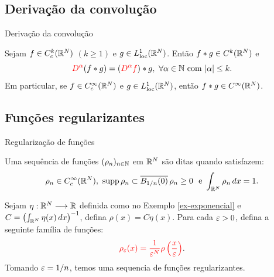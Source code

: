 \subsection*{Derivação da convolução}
\begin{frame}{Derivação da convolução}
		
	\begin{prop}
		Sejam  {\color{red}$f\in C_c^k(\mathbb{R}^N)$} $(k\geq 1)$ e $g\in L_{\operatorname{loc}}^1(\mathbb{R}^N)$. Então {\color{red}$f\ast g\in C^k(\mathbb{R}^N)$} e 
		\[{\color{red}D^\alpha}(f\ast g)=({\color{red}D^\alpha f})\ast g,\ \forall \alpha\in \mathbb{N} \text{ com } |\alpha|\leq k.\]
		Em particular, se $f\in C_c^\infty(\mathbb{R}^N)$ e $g\in L_{\operatorname{loc}}^1(\mathbb{R}^N)$, então $f\ast g\in C^\infty(\mathbb{R}^N)$.
	\end{prop}
\end{frame}

\subsection*{Funções regularizantes}
\begin{frame}{Regularização de funções \footnotemark}
		\begin{defin}
		Uma sequência de funções  $(\rho_n)_{n\in \mathbb{N}}$ em $\mathbb{R}^N$ são ditas  quando satisfazem:
		\[\rho_n\in C_c^\infty (\R^\dm),\ \supp \rho_n \subset \overline{B_{1/n}(0)}\, \rho_n \geq 0 \ \text{ e } \int_{\R^\dm}\rho_n\, dx=1.\]
	\end{defin}
	\begin{exe}\label{seq-regul}
		Sejam $\eta:\mathbb{R}^N\longrightarrow \mathbb{R}$ definida como no Exemplo \ref{ex-exponencial} e \(C=\left(\int_{\mathbb{R}^N} \eta(x)\,dx\right)^{-1}\), defina \(\rho(x)=C\eta(x)\). Para cada $\varepsilon>0$, defina a seguinte família de funções:
		\[\textcolor{red}{\rho_\varepsilon(x)=\frac{1}{\varepsilon^N}\rho\left(\frac{x}{\varepsilon}\right)}.\]
Tomando $\varepsilon=1/n$, temos uma sequencia de funções regularizantes.
	\end{exe}
\end{frame}


